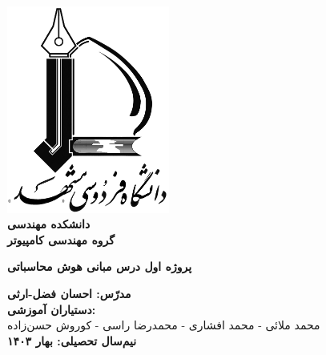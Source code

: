  \begin{titlepage}
 	\begin{center}
 		\includegraphics[width=0.4\textwidth]{logo.png}\\
 		
 		\LARGE
 		\textbf{دانشکده مهندسی}\\
 		\textbf{گروه مهندسی کامپیوتر}\\
 		
 		\vfill
 		
 		\huge
 		\textbf{پروژه اول درس مبانی هوش محاسباتی}\\
 		
 		\vfill
 		
 		\LARGE
 		\textbf{مدرّس: احسان فضل-ارثی}\\
 		\textbf{دستیاران آموزشی:}\\
 		محمد ملائی - محمد افشاری - محمد‌رضا راسی - کوروش حسن‌زاده \\
 		
 		\textbf{نیم‌سال تحصیلی: بهار ۱۴۰۳}\\
 	\end{center}
 \end{titlepage}
 